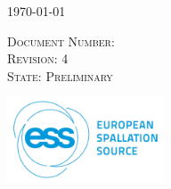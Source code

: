 \documentclass[12pt]{article}
\begin{document}
\begin{titlepage}


\vspace{7mm}
\begin{center}
{\large \today}
\end{center}
 \textsc{\small Document Number: }\\
 \textsc{\small Revision: 4}\\
  \textsc{\small State: Preliminary}\\
\vspace{21 mm}
\newcommand*{\plogo}{\includegraphics[width=0.35\textwidth]{ESS_logo.png}}

\plogo\\[1cm] %
 

\vfill %



\pagebreak
\newpage





\end{titlepage}
\end{document}
